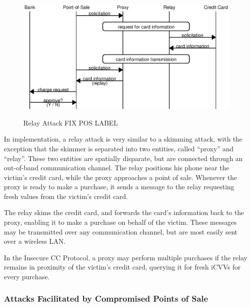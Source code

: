 \begin{figure}
  \caption{Relay Attack FIX POS LABEL}
  \centering
    \includegraphics{img/attack-3-relay.eps}
  \label{fig:insecure-relay}
\end{figure}

In implementation, a relay attack is very similar to a skimming attack, with the exception that the skimmer is separated into two entities, called ``proxy'' and ``relay''.
These two entities are spatially disparate, but are connected through an out-of-band communication channel.
The relay positions his phone near the victim's credit card, while the proxy approaches a point of sale.
Whenever the proxy is ready to make a purchase, it sends a message to the relay requesting fresh values from the victim's credit card.

The relay skims the credit card, and forwards the card's information back to the proxy, enabling it to make a purchase on behalf of the victim.
These messages may be transmitted over any communication channel, but are most easily sent over a wireless LAN.

In the Insecure CC Protocol, a proxy may perform multiple purchases if the relay remains in proximity of the victim's credit card, querying it for fresh iCVVs for every purchase.





\subsubsection{Attacks Facilitated by Compromised Points of Sale}
\label{sec:insecure-compromised}

